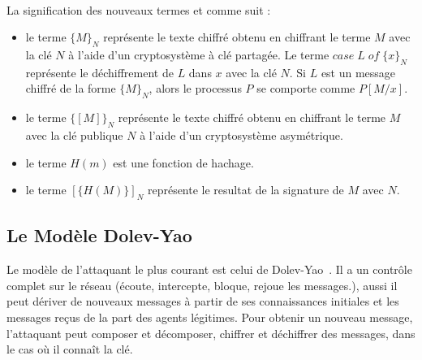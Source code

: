 \documentclass[10pt,a4paper]{article}
\begin{document}
\paragraph{}
La signification des nouveaux termes et comme suit :
\begin{itemize}
\item le terme ${\lbrace M\rbrace}_{N}$ représente le texte chiffré obtenu en chiffrant le terme $M$ avec la clé $N$ à l'aide d'un cryptosystème à clé partagée. Le terme $case\;L\;of\;{\lbrace x\rbrace}_{N}$ représente le déchiffrement de $L$ dans $x$ avec la clé $N$. Si $L$ est un message chiffré de la forme ${\lbrace M\rbrace}_{N}$, alors le processus $P$ se comporte comme $P[M/x]$. 
\item le terme ${\lbrace [M]\rbrace}_{N}$ représente le texte chiffré obtenu en chiffrant le terme $M$ avec la clé publique $N$ à l'aide d'un cryptosystème asymétrique.
\item le terme $H(m)$ est une fonction de hachage.
\item le terme ${[\lbrace H(M)\rbrace]}_{N}$ représente le resultat de la signature de $M$ avec $N$.
\end{itemize}
\subsection{Le Modèle Dolev-Yao}
Le modèle de l'attaquant le plus courant est celui de Dolev-Yao~\cite{ref3}. Il a un contr\^{o}le complet sur le réseau (écoute, intercepte, bloque, rejoue les messages.), aussi il peut dériver de nouveaux messages à partir de ses connaissances initiales et les messages reçus de la part des agents légitimes. Pour obtenir un nouveau message, l'attaquant peut composer et décomposer, chiffrer et déchiffrer des messages, dans le cas o\`{u} il connaît la clé.\newline
\end{document}
